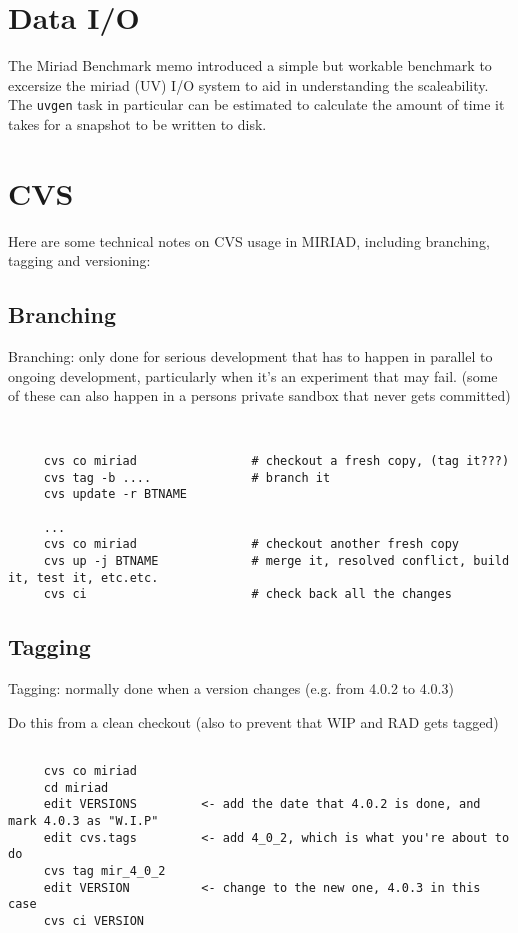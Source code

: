 \section{Data I/O}

The Miriad Benchmark memo introduced a simple but workable benchmark to excersize
the miriad (UV) I/O system to aid in understanding the scaleability. The
{\tt uvgen} task in particular can be estimated to calculate the amount
of time it takes for a snapshot to be written to disk.

\section{CVS}

Here are some technical notes on CVS usage in MIRIAD, including branching, tagging
and versioning:

\subsection{Branching}

Branching:  only
done for serious development that has to happen in parallel to ongoing
development, particularly when it's an experiment that may fail.
(some of these can also happen in a persons private sandbox that never gets
committed)

\begin{verbatim}


     cvs co miriad                # checkout a fresh copy, (tag it???)
     cvs tag -b ....              # branch it
     cvs update -r BTNAME
     
     ...
     cvs co miriad                # checkout another fresh copy
     cvs up -j BTNAME             # merge it, resolved conflict, build it, test it, etc.etc.
     cvs ci                       # check back all the changes
\end{verbatim}

\subsection{Tagging}

Tagging: normally done when a version changes (e.g. from 4.0.2 to 4.0.3)

Do this from a clean checkout (also to prevent that WIP and RAD gets tagged)

\begin{verbatim}

     cvs co miriad
     cd miriad
     edit VERSIONS         <- add the date that 4.0.2 is done, and mark 4.0.3 as "W.I.P"
     edit cvs.tags         <- add 4_0_2, which is what you're about to do
     cvs tag mir_4_0_2
     edit VERSION          <- change to the new one, 4.0.3 in this case
     cvs ci VERSION


\end{verbatim}

